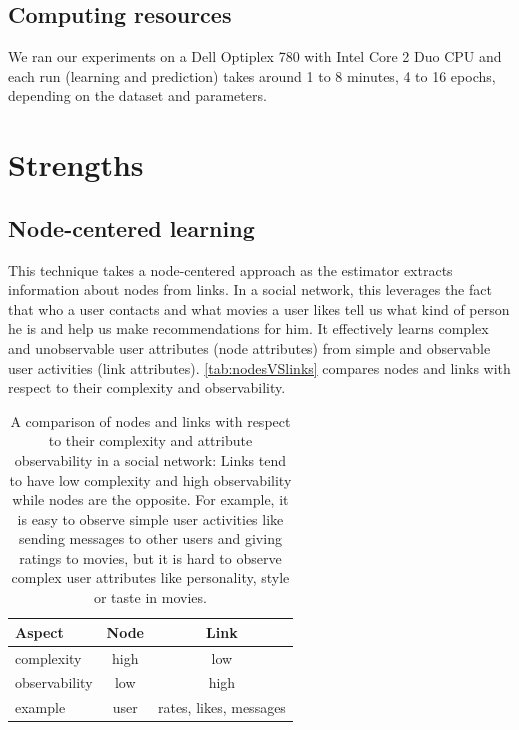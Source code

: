 \documentclass[twocolumn]{article}
\begin{document}
\subsection{Computing resources}
We ran our experiments on a Dell Optiplex 780 with Intel Core 2 Duo CPU and 
each run (learning and prediction) takes around 1 to 8 minutes, 4 to 16 epochs, 
depending on the dataset and parameters.

\section{Strengths}

\subsection{Node-centered learning}
This technique takes a node-centered approach as the estimator extracts 
information about nodes from links.
In a social network, this leverages the fact that who a user contacts and what 
movies a user likes tell us what kind of person he is and help us make 
recommendations for him.
It effectively learns complex and unobservable user attributes (node 
attributes) from simple and observable user activities (link attributes). 
\autoref{tab:nodesVSlinks} compares nodes and links with respect to their 
complexity and observability.
\begin{table}[h]
	\centering
	\caption{A comparison of nodes and links with respect to their complexity 
		and attribute observability in a social network:
		Links tend to have low complexity and high observability while nodes 
		are the opposite.
		For example, it is easy to observe simple user activities like sending 
		messages to other users and giving ratings to movies,
		but it is hard to observe complex user attributes like personality, 
		style or taste in movies.}
	\begin{tabularx}{0.5\textwidth}{ |X|c|c| } \hline
		\textbf{Aspect} & \textbf{Node} & \textbf{Link} \\ \hline
		complexity & high & low \\ \hline
		observability & low & high \\ \hline
		example & user & rates, likes, messages \\ \hline
	\end{tabularx}
	\label{tab:nodesVSlinks}
\end{table}
\end{document}
